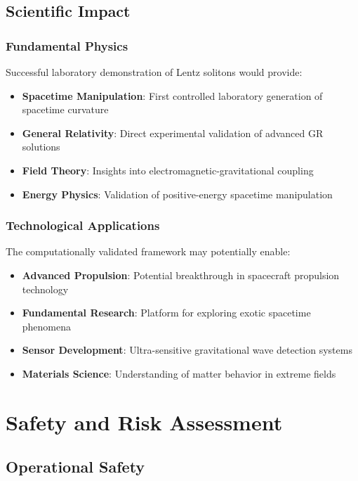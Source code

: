 \documentclass[12pt,a4paper]{article}
\begin{document}
\subsection{Scientific Impact}

\subsubsection{Fundamental Physics}
Successful laboratory demonstration of Lentz solitons would provide:
\begin{itemize}
\item \textbf{Spacetime Manipulation}: First controlled laboratory generation of spacetime curvature
\item \textbf{General Relativity}: Direct experimental validation of advanced GR solutions
\item \textbf{Field Theory}: Insights into electromagnetic-gravitational coupling
\item \textbf{Energy Physics}: Validation of positive-energy spacetime manipulation
\end{itemize}

\subsubsection{Technological Applications}
The computationally validated framework may potentially enable:
\begin{itemize}
\item \textbf{Advanced Propulsion}: Potential breakthrough in spacecraft propulsion technology
\item \textbf{Fundamental Research}: Platform for exploring exotic spacetime phenomena
\item \textbf{Sensor Development}: Ultra-sensitive gravitational wave detection systems
\item \textbf{Materials Science}: Understanding of matter behavior in extreme fields
\end{itemize}

\section{Safety and Risk Assessment}

\subsection{Operational Safety}
\end{document}

